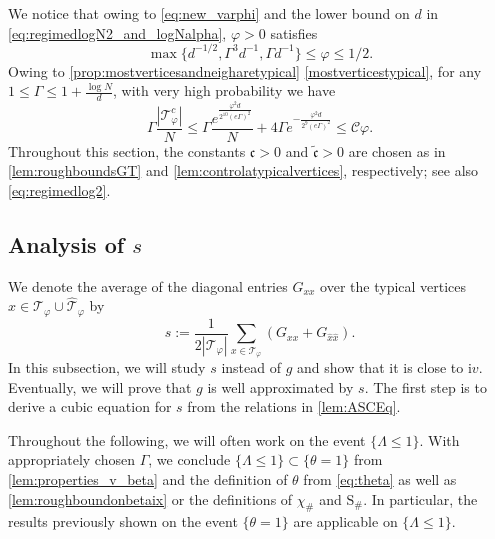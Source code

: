 \documentclass[11pt]{article}
\newcommand{\ii}{\mathrm{i}}
\newcommand{\abs}[1]{\left| #1 \right|}
\newcommand{\ccc}{\mathfrak{c}}
\theoremstyle{plain}
\theoremstyle{remark}
\numberwithin{equation}{section}
\newcommand*\ubarr[1]{{\widehat{#1}}}
\begin{document}
	We notice that owing to \eqref{eq:new_varphi} and the lower bound on $d$ in \eqref{eq:regimedlogN2_and_logNalpha}, $\varphi >0 $ satisfies 
	\begin{equation} \label{eq:d_inverse_square_root_smaller_varphi_a}
		\max\{d^{-1/2}, \Gamma^3 d^{-1}, \Gamma d^{-1}\} \le \varphi \le 1/2.
	\end{equation}
	 Owing to \cref{prop:mostverticesandneigharetypical} \cref{mostverticestypical}, 
	 for any $1 \leq \Gamma \leq 1 + \frac{\log N}{d}$, with very high probability we have
	\begin{equation}\label{eq:number_atypical_vertices} 
	 \Gamma 	\frac{\abs{\mathcal{T}^c_{\varphi}}}{N} \le\Gamma \frac{e^{\frac{\varphi^2d}{2^{10} (e\Gamma)^2}}}{N}  + 4 \Gamma e^{-\frac{\varphi^2d}{2^{9} (e\Gamma)^2}}   \le \mathcal{C}\varphi.
	\end{equation} 
	Throughout this section, the constants $\ccc>0$ and $\tilde{\ccc} >0 $ are 
	chosen as in \cref{lem:roughboundsGT} and \cref{lem:controlatypicalvertices}, respectively; see also \cref{eq:regimedlog2}. 

	
	

	\subsection{Analysis of $s$} 
	
	We denote the average of the diagonal entries $G_{xx}$ over the typical vertices $x \in \mathcal T_\varphi \cup \widehat{\mathcal T}_\varphi$ by 
	\begin{equation}\label{eq:meanoftypicalvertices}
		s:= \frac{1}{2\abs{\mathcal{T}_{\varphi}}} \sum_{x \in \mathcal{T}_{\varphi}} \left(G_{xx} + G_{\ubarr{x}\ubarr{x}}\right). 
	\end{equation} 
	In this subsection, we will study $s$ instead of $g$ and show that it is close to $\ii v$. 
	Eventually, we will prove that $g$ is well approximated by $s$. 
	The first step is to derive a cubic equation for $s$ from the relations in \cref{lem:ASCEq}.  
	
 Throughout the following, we will often work on the event $\{ \Lambda \leq 1\}$. 
	With appropriately chosen $\Gamma$, we conclude $\{ \Lambda \leq 1\} \subset \{ \theta = 1\}$ from \cref{lem:properties_v_beta} and the definition of $\theta$ from 
	\cref{eq:theta} as well as \cref{lem:roughboundonbetaix} or the definitions of $\chi_\#$ and $\mathrm{S}_\#$. In particular, the results previously shown on the event $\{ \theta =1\}$ are applicable on $\{ \Lambda \leq 1\}$. 
	
\end{document}

